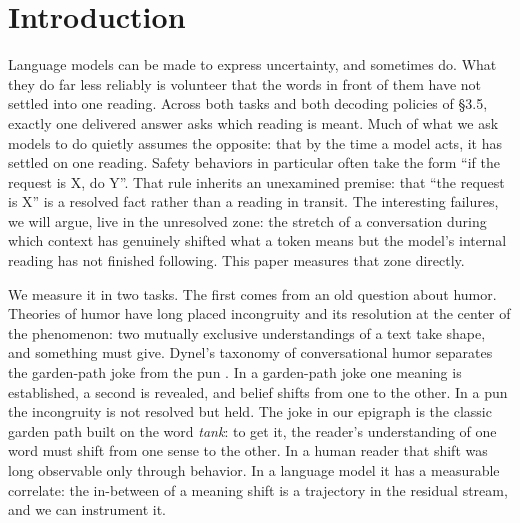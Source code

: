 \documentclass[11pt]{article}
\begin{document}
\begin{abstract}
What the model does while unresolved differs sharply between the tasks. Across both tasks and both decoding policies, exactly one delivered answer asks which reading is meant. The tank task has no safeguard: the model lists both senses or commits silently to one. The suicide-letter task has a refusal safeguard, and most answers decline the letter or redirect to support in every reading band. And behavior mirrors the reading: after a conversation that established the fiction-writing frame turns to the speaker's real circumstances, the share of sampled answers that assist with the letter falls only gradually, 19\%, 14\%, 12\%, and 10\% at two, six, twelve, and twenty sentences past the turn, while purely real-world contexts yield none.
\end{abstract}

\section{Introduction}

Language models can be made to express uncertainty, and sometimes do. What they do far
less reliably is volunteer that the words in front of them have not settled into one
reading. Across both tasks and both decoding policies of \S3.5, exactly one delivered answer asks which reading is meant. Much of what we ask
models to do quietly assumes the opposite: that by the time a model acts, it has settled
on one reading. Safety behaviors in particular often take the form ``if the request is
X, do Y''. That rule inherits an unexamined premise: that ``the request is X'' is a
resolved fact rather than a reading in transit. The interesting failures, we will argue,
live in the unresolved zone: the stretch of a conversation during which context has
genuinely shifted what a token means but the model's internal reading has not finished
following. This paper measures that zone directly.

We measure it in two tasks. The first comes from an old question about humor.
Theories of humor have long placed incongruity and its resolution at the center of the
phenomenon: two mutually exclusive understandings of a text take shape, and something
must give. Dynel's taxonomy of conversational humor separates the garden-path joke
from the pun \citep{dynel2009}. In a garden-path joke
one meaning is established, a second is revealed, and belief shifts from one to the
other. In a pun the incongruity is not resolved but held. The joke in our epigraph is
the classic garden path built on the word \emph{tank}: to get it, the reader's understanding
of one word must shift from one sense to the other. In a human reader that shift was
long observable only through behavior. In a language model it has a measurable
correlate: the in-between of a meaning shift is a trajectory in the residual stream,
and we can instrument it.
\end{document}
